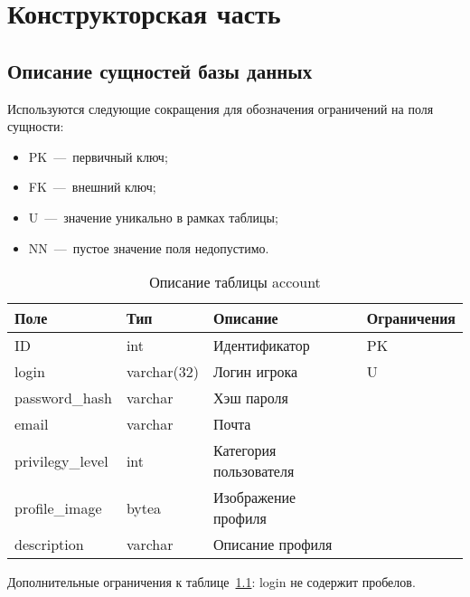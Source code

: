 \chapter{Конструкторская часть}


\section{Описание сущностей базы данных}

Используются следующие сокращения для обозначения ограничений на поля сущности:
\begin{itemize}
	\item PK~---~первичный ключ;
	\item FK~---~внешний ключ;
	\item U~---~значение уникально в рамках таблицы;
	\item NN~---~пустое значение поля недопустимо.
\end{itemize}

\newenvironment{dbtable}[2]{
\begin{table}[h!]
	\caption{\label{db_table:#1} #2 }
	\begin{tabular}{|p{3cm}|p{3cm}|p{6cm}|p{3cm}|}
	\hline
	Поле & Тип & Описание & Ограничения \\\hline
}
{
\end{tabular}
\end{table}
}

\begin{dbtable}{account}{Описание таблицы account}
	ID & int & Идентификатор & PK \\\hline
	login & varchar(32) & Логин игрока & U \\\hline
	password\_hash & varchar & Хэш пароля & \\\hline
	email & varchar & Почта & \\\hline
	privilegy\_level & int & Категория пользователя &\\\hline
	profile\_image & bytea & Изображение профиля &\\\hline
	description & varchar & Описание профиля &\\\hline
\end{dbtable}

Дополнительные ограничения к таблице~\ref{db_table:account}: login не содержит пробелов.

